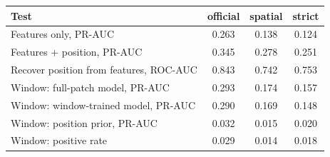 \begin{tabular}{lccc}
\toprule
Test & official & spatial & strict \\
\midrule
Features only, PR-AUC & 0.263 & 0.138 & 0.124 \\
Features + position, PR-AUC & 0.345 & 0.278 & 0.251 \\
Recover position from features, ROC-AUC & 0.843 & 0.742 & 0.753 \\
Window: full-patch model, PR-AUC & 0.293 & 0.174 & 0.157 \\
Window: window-trained model, PR-AUC & 0.290 & 0.169 & 0.148 \\
Window: position prior, PR-AUC & 0.032 & 0.015 & 0.020 \\
Window: positive rate & 0.029 & 0.014 & 0.018 \\
\bottomrule
\end{tabular}
